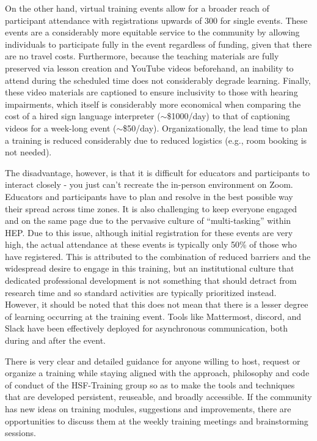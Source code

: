 \documentclass[twocolumn]{svjour3}          %
\begin{document}
On the other hand, virtual training events allow for a broader reach of participant attendance with registrations upwards of 300 for single events.  These events are a considerably more equitable service to the community by allowing individuals to participate fully in the event regardless of funding, given that there are no travel costs. Furthermore, because the teaching materials are fully preserved via lesson creation and YouTube videos beforehand, an inability to attend during the scheduled time does not considerably degrade learning.  Finally, these video materials are captioned to ensure inclusivity to those with hearing impairments, which itself is considerably more economical when comparing the cost of a hired sign language interpreter ($\sim$\$1000/day) to that of captioning videos for a week-long event ($\sim$\$50/day). Organizationally, the lead time to plan a training is reduced considerably due to reduced logistics (e.g., room booking is not needed).

The disadvantage, however, is that it is difficult for educators and participants to interact closely - you just can’t recreate the in-person environment on Zoom. Educators and participants have to plan and resolve in the best possible way their spread across time zones. It is also challenging to keep everyone engaged and on the same page due to the pervasive culture of ``multi-tasking'' within HEP. Due to this issue, although initial registration for these events are very high, the actual attendance at these events is typically only 50\% of those who have registered. This is attributed to the combination of reduced barriers and the widespread desire to engage in this training, but an institutional culture that dedicated professional development is not something that should detract from research time and so standard activities are typically prioritized instead.  However, it should be noted that this does not mean that there is a lesser degree of learning occurring at the training event. Tools like Mattermost, discord, and Slack have been effectively deployed for asynchronous communication, both during and after the event. 

There is very clear and detailed guidance for anyone willing to host, request or organize a training while staying aligned with the approach, philosophy and code of conduct of the HSF-Training group so as to make the tools and techniques that are developed persistent, reuseable, and broadly accessible. If the community has new ideas on training modules, suggestions and improvements, there are opportunities to discuss them at the weekly training meetings and brainstorming sessions.
%
\end{document}
